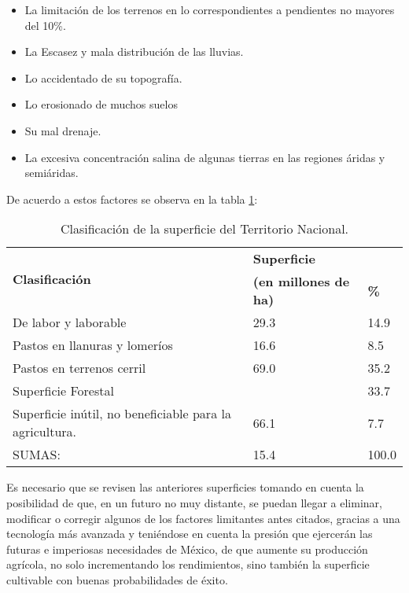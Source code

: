 \begin{itemize}
	\item La limitación de los terrenos en lo correspondientes a pendientes no mayores del 10\%.
	\item La Escasez y mala distribución de las lluvias.
	\item Lo accidentado de su topografía.
	\item Lo erosionado de muchos suelos
	\item Su mal drenaje.
	\item La excesiva concentración salina de algunas tierras en las regiones áridas y semiáridas.
\end{itemize}
De acuerdo a estos factores se observa en la tabla \ref{tabseven}:
\begin{table}[h!]
	\centering
	\begin{tabular}{|l|l|l|}
		\hline
		\multirow{2}{*}{\textbf{Clasificación}}                 & \multicolumn{2}{l|}{\textbf{Superficie}}               \\ \cline{2-3}
		                                                        & \textbf{(en millones de ha)}             & \textbf{\%} \\ \hline
		De labor y laborable                                    & 29.3                                     & 14.9        \\ \hline
		Pastos en llanuras y lomeríos                           & 16.6                                     & 8.5         \\ \hline
		Pastos en terrenos cerril                               & 69.0                                     & 35.2        \\ \hline
		Superficie Forestal                                     &                                          & 33.7        \\ \hline
		Superficie inútil, no beneficiable para la agricultura. & 66.1                                     & 7.7         \\ \hline
		SUMAS:                                                  & 15.4                                     & 100.0       \\ \hline
	\end{tabular}
	\caption{Clasificación de la superficie del Territorio Nacional.}
	\label{tabseven}
\end{table}
Es necesario que se revisen las anteriores superficies tomando en cuenta la posibilidad de que, en un futuro no muy distante, se puedan llegar a eliminar, modificar o corregir algunos de los factores limitantes antes citados, gracias a una tecnología más avanzada y teniéndose en cuenta la presión que ejercerán las futuras e imperiosas necesidades de México, de que aumente su producción agrícola, no solo incrementando los rendimientos, sino también la superficie cultivable con buenas probabilidades de éxito.
